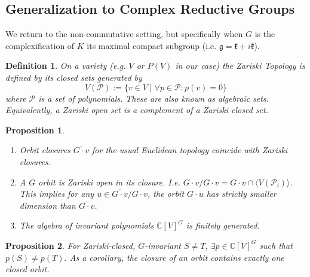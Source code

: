 \documentclass{article}
\newtheorem{prop}{Proposition}
\newtheorem{definition}{Definition}
\newcommand{\C}{{\mathbb{C}}}
\begin{document}
\subsection{Generalization to Complex Reductive Groups}
We return to the non-commutative setting, but specifically when $G$ is the complexification of $K$ its maximal compact subgroup (i.e. $\mathfrak{g} = \mathfrak{k} + i \mathfrak{k}$). 

\begin{definition}
On a variety (e.g. $V$ or $P(V)$ in our case) the Zariski Topology is defined by its closed sets generated by
\[ V(\mathcal{P}) := \{v \in V \mid \forall p \in \mathcal{P}: p(v) = 0\}  \]
where $\mathcal{P}$ is a set of polynomials. These are also known as algebraic sets. Equivalently, a Zariski open set is a complement of a Zariski closed set. 
\end{definition}

\begin{prop}
\begin{enumerate}
    \item Orbit closures $\overline{G \cdot v}$ for the usual Euclidean topology coincide with Zariski closures. 
    \item A $G$ orbit is Zariski open in its closure. I.e. $\overline{G \cdot v}/ G \cdot v = \overline{G \cdot v} \cap \langle V(\mathcal{P}_{i}) \rangle$. This implies for any $u \in \overline{G \cdot v}/ G \cdot v$, the orbit $G \cdot u$ has strictly smaller dimension than $G \cdot v$.  
    \item The algebra of invariant polynomials $\C[V]^{G}$ is finitely generated. 
\end{enumerate}
\end{prop}

\begin{prop}
For Zariski-closed, $G$-invariant $S \neq T$, $\exists p \in \C[V]^{G}$ such that $p(S) \neq p(T)$. As a corollary, the closure of an orbit contains exactly one closed orbit. 
\end{prop}
\end{document}
